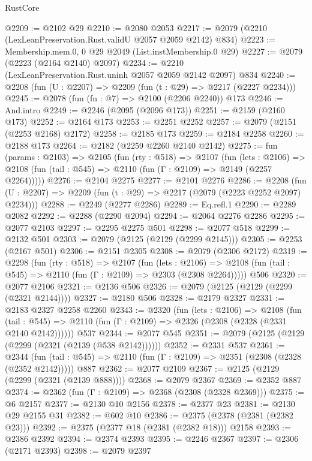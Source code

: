 \begin{lexlean}{RustCore}
\begin{coremodule}
@2209 := @2102 @29
@2210 := @2080 @2053
@2217 := @2079 (@2210 (LexLeanPreservation.Rust.validU @2057 @2059 @2142) @834)
@2223 := Membership.mem.{0, 0} @29 @2049 (List.instMembership.{0} @29)
@2227 := @2079 (@2223 (@2164 @2140) @2097)
@2234 := @2210 (LexLeanPreservation.Rust.uninh @2057 @2059 @2142 @2097) @834
@2240 := @2208 (fun (U : @2207) => @2209 (fun (t : @29) => @2217 (@2227 @2234)))
@2245 := @2078 (fun (fn : @7) => @2100 (@2206 @2240)) @173
@2246 := And.intro
@2249 := @2246 (@2095 (@2096 @173))
@2251 := @2159 (@2160 @173)
@2252 := @2164 @173
@2253 := @2251 @2252
@2257 := @2079 (@2151 (@2253 @2168) @2172)
@2258 := @2185 @173
@2259 := @2184 @2258
@2260 := @2188 @173
@2264 := @2182 (@2259 @2260 @2140 @2142)
@2275 := fun (params : @2103) =>
  @2105
    (fun (rty : @518) =>
    @2107
      (fun (lets : @2106) =>
      @2108 (fun (tail : @545) => @2110 (fun (Γ : @2109) => @2149 (@2257 @2264)))))
@2276 := @2104 @2275
@2277 := @2101 @2276
@2286 := @2208 (fun (U : @2207) => @2209 (fun (t : @29) => @2217 (@2079 (@2223 @2252 @2097) @2234)))
@2288 := @2249 (@2277 @2286)
@2289 := Eq.refl.{1}
@2290 := @2289 @2082
@2292 := @2288 (@2290 @2094)
@2294 := @2064 @2276 @2286
@2295 := @2077 @2103
@2297 := @2295 @2275 @501
@2298 := @2077 @518
@2299 := @2132 @501
@2303 := @2079 (@2125 (@2129 (@2299 @2145)))
@2305 := @2253 (@2167 @501)
@2306 := @2151 @2305
@2308 := @2079 (@2306 @2172)
@2319 := @2298
    (fun (rty : @518) =>
    @2107
      (fun (lets : @2106) =>
      @2108 (fun (tail : @545) => @2110 (fun (Γ : @2109) => @2303 (@2308 @2264)))))
    @506
@2320 := @2077 @2106
@2321 := @2136 @506
@2326 := @2079 (@2125 (@2129 (@2299 (@2321 @2144))))
@2327 := @2180 @506
@2328 := @2179 @2327
@2331 := @2183 @2327 @2258 @2260
@2343 := @2320
    (fun (lets : @2106) =>
    @2108
      (fun (tail : @545) => @2110 (fun (Γ : @2109) => @2326 (@2308 (@2328 (@2331 @2140 @2142))))))
    @537
@2344 := @2077 @545
@2351 := @2079 (@2125 (@2129 (@2299 (@2321 (@2139 (@538 @2142))))))
@2352 := @2331 @537
@2361 := @2344
    (fun (tail : @545) => @2110 (fun (Γ : @2109) => @2351 (@2308 (@2328 (@2352 @2142)))))
    @887
@2362 := @2077 @2109
@2367 := @2125 (@2129 (@2299 (@2321 (@2139 @888))))
@2368 := @2079 @2367
@2369 := @2352 @887
@2374 := @2362 (fun (Γ : @2109) => @2368 (@2308 (@2328 @2369)))
@2375 := @6 @2157
@2377 := @2130 @10 @2156
@2378 := @2377 @23
@2381 := @2130 @29 @2155 @31
@2382 := @602 @10
@2386 := @2375 (@2378 (@2381 (@2382 @23)))
@2392 := @2375 (@2377 @18 (@2381 (@2382 @18))) @2158
@2393 := @2386 @2392
@2394 := @2374 @2393
@2395 := @2246 @2367
@2397 := @2306 (@2171 @2393)
@2398 := @2079 @2397

\end{coremodule}
\end{lexlean}

